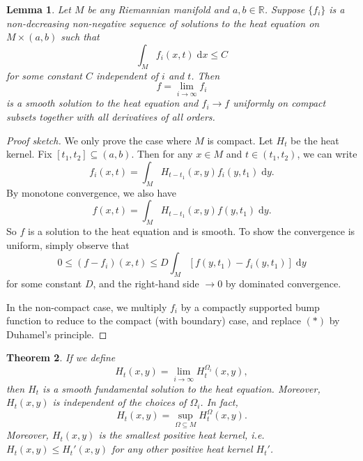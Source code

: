 \documentclass{shortart}
\newtheorem{thm}{Theorem}[section]
\newtheorem{lemma}[thm]{Lemma}
\theoremstyle{definition}
\newcommand\R{\mathbb{R}}
\renewcommand\d{\mathrm{d}}
\begin{document}
\begin{lemma}\label{lem:solutions-converge}
  Let $M$ be any Riemannian manifold and $a, b \in \R$.  Suppose $\{f_i\}$ is a non-decreasing non-negative sequence of solutions to the heat equation on $M \times (a, b)$ such that
  \[
    \int_M f_i(x, t)\;\d x \leq C
  \]
  for some constant $C$ independent of $i$ and $t$. Then
  \[
    f = \lim_{i \to \infty} f_i
  \]
  is a smooth solution to the heat equation and $f_i \to f$ uniformly on compact subsets together with all derivatives of all orders.
\end{lemma}

\begin{proof}[Proof sketch]
  We only prove the case where $M$ is compact. Let $H_t$ be the heat kernel. Fix $[t_1, t_2] \subseteq (a, b)$. Then for any $x \in M$ and $t \in (t_1, t_2)$, we can write
  \[
    f_i(x, t) = \int_M H_{t - t_1}(x, y) f_i(y, t_1)\;\d y.\tag{$*$}
  \]
  By monotone convergence, we also have
  \[
    f(x, t) = \int_M H_{t - t_1} (x, y) f(y, t_1) \;\d y.
  \]
  So $f$ is a solution to the heat equation and is smooth. To show the convergence is uniform, simply observe that
  \[
    0 \leq (f - f_i)(x, t) \leq D \int_M \left[f(y, t_1) - f_i(y, t_1)\right]\;\d y 
  \]
  for some constant $D$, and the right-hand side $\to 0$ by dominated convergence.

  In the non-compact case, we multiply $f_i$ by a compactly supported bump function to reduce to the compact (with boundary) case, and replace $(*)$ by Duhamel's principle.
\end{proof}

\begin{thm}
  If we define
  \[
    H_t(x, y) = \lim_{i \to \infty} H_t^{\Omega_i}(x, y),
  \]
  then $H_t$ is a smooth fundamental solution to the heat equation. Moreover, $H_t(x, y)$ is independent of the choices of $\Omega_i$. In fact,
  \[
    H_t(x, y) = \sup_{\Omega \subseteq M} H_t^\Omega(x, y).
  \]
  Moreover, $H_t(x, y)$ is the smallest positive heat kernel, i.e.\ $H_t(x, y) \leq H_t'(x, y)$ for any other positive heat kernel $H_t'$.
\end{thm}
\end{document}

